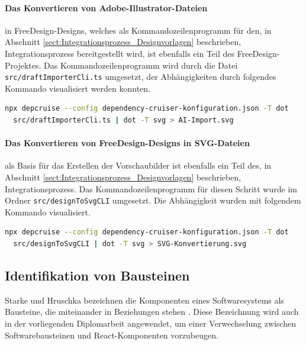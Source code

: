 \paragraph{Das Konvertieren von Adobe-Illustrator-Dateien} in FreeDesign-Designs, welches als Kommandozeilenprogramm für den, in Abschnitt \ref{sect:Integrationsprozess_Designvorlagen} beschrieben, Integrationsprozess bereitgestellt wird, ist ebenfalls ein Teil des FreeDesign-Projektes. 
Das Kommandozeilenprogramm wird durch die Datei \lstinline|src/draftImporterCli.ts| umgesetzt, der Abhängigkeiten durch folgendes Kommando visualisiert werden konnten.
\begin{lstlisting}[language={sh}, label=depcruise-draft-import, caption=Visualisierung der Abhängigkeiten des Programms zum Import der AI-Dateien]
npx depcruise --config dependency-cruiser-konfiguration.json -T dot 
  src/draftImporterCli.ts | dot -T svg > AI-Import.svg
\end{lstlisting}

\paragraph{Das Konvertieren von FreeDesign-Designs in SVG-Dateien} als Basis für das Erstellen der Vorschaubilder ist ebenfalls ein Teil des, in Abschnitt \ref{sect:Integrationsprozess_Designvorlagen} beschrieben, Integrationsprozess.  
Das Kommandozeilenprogramm für diesen Schritt wurde im Ordner \lstinline|src/designToSvgCLI| umgesetzt. Die Abhängigkeit wurden mit folgendem Kommando visualisiert.
\begin{lstlisting}[language={sh}, label=depcruise-design-to-svg, caption=Visualisierung des Kommandozeilenprogramms designToSvgCLI]
npx depcruise --config dependency-cruiser-konfiguration.json -T dot 
  src/designToSvgCLI | dot -T svg > SVG-Konvertierung.svg
\end{lstlisting}



\subsection{Identifikation von Bausteinen}
Starke und Hruschka bezeichnen die Komponenten eines Softwaresystems als Bausteine, die miteinander in Beziehungen stehen \autocite[vgl.][24]{Starke2011}. Diese Bezeichnung wird auch in der vorliegenden Diplomarbeit angewendet, um einer Verwechselung zwischen Softwarebausteinen und React-Komponenten vorzubeugen.

